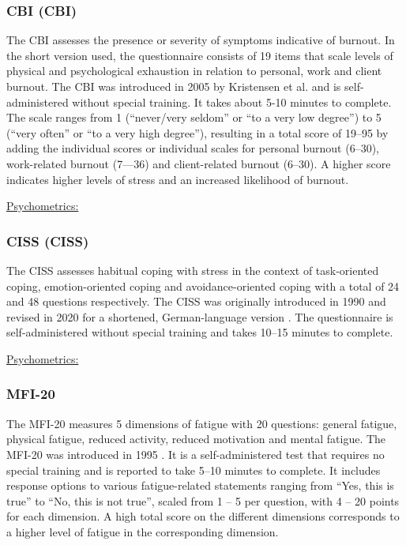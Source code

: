 \subsubsection{\acl{CBI} (\acs{CBI})}
\label{questionnaires:CBI}
The \acl{CBI} assesses the presence or severity of symptoms indicative of burnout. In the short version used, the questionnaire consists of 19 items that scale levels of physical and psychological exhaustion in relation to personal, work and client burnout. The CBI was introduced in 2005 by Kristensen et al. \cite{kristensen2005cbi} and is self-administered without special training. It takes about 5-10 minutes to complete. The scale ranges from 1 (``never/very seldom'' or ``to a very low degree'') to 5 (``very often'' or ``to a very high degree''), resulting in a total score of 19--95 by adding the individual scores or individual scales for personal burnout (6--30), work-related burnout (7---36) and client-related burnout (6--30). A higher score indicates higher levels of stress and an increased likelihood of burnout.

\underline{Psychometrics:}

\subsubsection{\acl{CISS} (\acs{CISS})}
\label{questionnaires:CISS}
The \acl{CISS} assesses habitual coping with stress in the context of task-oriented coping, emotion-oriented coping and avoidance-oriented coping with a total of 24 and 48 questions respectively. The CISS was originally introduced in 1990 \cite{endler1990ciss} and revised in 2020 for a shortened, German-language version \cite{kalin2020ciss}. The questionnaire is self-administered without special training and takes 10--15 minutes to complete.


\underline{Psychometrics:}

\subsubsection{\acl{MFI-20}}
\label{questionnaires:MFI20}
The \acl{MFI-20} measures 5 dimensions of fatigue with 20 questions: general fatigue, physical fatigue, reduced activity, reduced motivation and mental fatigue. The \acs{MFI-20} was introduced in 1995 \cite{smets1995mfi20}. It is a self-administered test that requires no special training and is reported to take 5--10 minutes to complete. It includes response options to various fatigue-related statements ranging from ``Yes, this is true'' to ``No, this is not true'', scaled from 1 -- 5 per question, with 4 -- 20 points for each dimension. A high total score on the different dimensions corresponds to a higher level of fatigue in the corresponding dimension.

